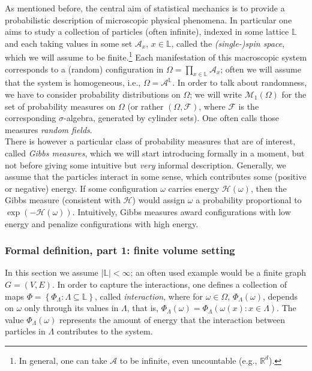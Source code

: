\documentclass[12pt]{article}
\newcommand{\A}{\mathcal{A}}
\newcommand{\F}{\mathcal{F}}
\renewcommand{\H}{\mathcal{H}}
\renewcommand{\L}{\mathbb{L}}
\newcommand{\M}{\mathcal{M}}
\newcommand{\R}{\mathbb{R}}
\newcommand{\set}[1]{\left\{#1\right\}}
\newcommand{\1}{\mathbbm{1}}
\newcommand{\5}{\vspace{0.5cm}}
\theoremstyle{definition}
\begin{document}
As mentioned before, the central aim of statistical mechanics is to provide a probabilistic description of microscopic physical phenomena. In particular one aims to study a collection of particles (often infinite), indexed in some lattice $\L$ and each taking values in some set $\A_x$, $x\in\L$, called the \textit{(single-)spin space}, which we will assume to be finite.\footnote{In general, one can take $\A$ to be infinite, even uncountable (e.g., $\R^d$).} Each manifestation of this macroscopic system corresponds to a (random) configuration in $\Omega=\prod_{x\in\L}\A_x$; often we will assume that the system is homogeneous, i.e., $\Omega=\A^{\L}$. In order to talk about randomness, we have to consider probability distributions on $\Omega$; we will write $\M_1(\Omega)$ for the set of probability measures on $\Omega$ (or rather $(\Omega,\F)$, where $\F$ is the  corresponding $\sigma$-algebra, generated by cylinder sets). One often calls those measures \textit{random fields}. \\

There is however a particular class of probability measures that are of interest, called \textit{Gibbs measures}, which we will start introducing formally in a moment, but not before giving some intuitive but \textit{very} informal description. Generally, we assume that the particles interact in some sense, which contributes some (positive or negative) energy. If some configuration $\omega$ carries energy $\H(\omega)$, then the Gibbs measure (consistent with $\H$) would assign $\omega$ a probability proportional to $\exp(-\H(\omega))$. Intuitively, Gibbs measures award configurations with low energy and penalize configurations with high energy. 


\subsubsection{Formal definition, part 1: finite volume setting}\label{FiniteVolumeSetting}

In this section we assume $|\L|<\infty$; an often used example would be a finite graph $G=(V,E)$. In order to capture the interactions, one defines a collection of maps $\Phi=\set{\Phi_\Lambda:\Lambda\subseteq\L}$, called \textit{interaction}, where for $\omega\in\Omega$, $\Phi_\Lambda(\omega)$, depends on $\omega$ only through its values in $\Lambda$, that is, $\Phi_\Lambda(\omega)=\Phi_\Lambda(\omega(x)\!:\!x\in\Lambda)$. The value $\Phi_\Lambda(\omega)$ represents the amount of energy that the interaction between particles in $\Lambda$ contributes to the system.
\end{document}

